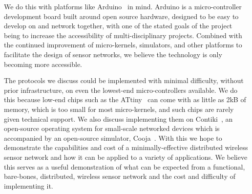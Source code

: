 We do this with platforms like Arduino~\cite{arduino} in mind.  Arduino is a micro-controller development board built
around open source hardware, designed to be easy to develop on and network together, with one of the stated goals of
the project being to increase the accessibility of multi-disciplinary projects.  Combined with the continued improvement
of micro-kernels, simulators, and other platforms to facilitate the design of sensor networks, we believe the technology
is only becoming more accessible.

The protocols we discuss could be implemented with minimal difficulty, without prior infrastructure, on even the lowest-end
micro-controllers available.  We do this because low-end chips such as the ATtiny~\cite{attinyds} can come with as little as
2kB of memory, which is too small for most micro-kernels, and such chips are rarely given technical support.  We also discuss
implementing them on Contiki~\cite{contiki},
an open-source operating system for small-scale networked devices which is accompanied by an open-source simulator,
Cooja~\cite{cooja}.  With this we hope to demonstrate the capabilities and cost of a minimally-effective distributed
wireless sensor network and how it can be applied to a variety of applications.  We believe this serves as a useful demonstration
of what can be expected from a functional, bare-bones, distributed, wireless sensor network and the cost and
difficulty of implementing it.

